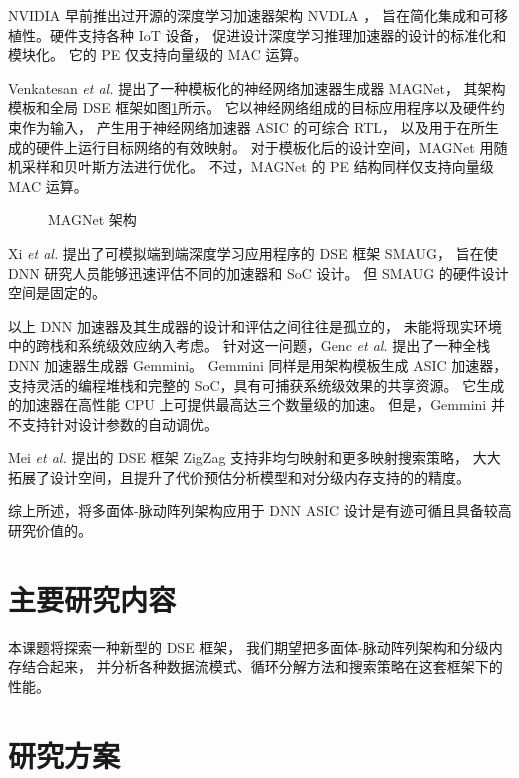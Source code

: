 NVIDIA 早前推出过开源的深度学习加速器架构 NVDLA \cite{nvidia_nvdla_2018}，
旨在简化集成和可移植性。硬件支持各种 IoT 设备，
促进设计深度学习推理加速器的设计的标准化和模块化。
它的 PE 仅支持向量级的 MAC 运算。

Venkatesan \textit{et al.}\cite{venkatesan_magnet_2019}
提出了一种模板化的神经网络加速器生成器 MAGNet，
其架构模板和全局 DSE 框架如图\ref{magnet}所示。
它以神经网络组成的目标应用程序以及硬件约束作为输入，
产生用于神经网络加速器 ASIC 的可综合 RTL，
以及用于在所生成的硬件上运行目标网络的有效映射。
对于模板化后的设计空间，MAGNet 用随机采样和贝叶斯方法进行优化。
不过，MAGNet 的 PE 结构同样仅支持向量级 MAC 运算。

\begin{figure}[htbp]
    \centering
    \caption{MAGNet 架构}
    \label{magnet}
\end{figure}

Xi \textit{et al.}\cite{xi_smaug_2020}
提出了可模拟端到端深度学习应用程序的 DSE 框架 SMAUG，
旨在使 DNN 研究人员能够迅速评估不同的加速器和 SoC 设计。
但 SMAUG 的硬件设计空间是固定的。

以上 DNN 加速器及其生成器的设计和评估之间往往是孤立的，
未能将现实环境中的跨栈和系统级效应纳入考虑。
针对这一问题，Genc \textit{et al.}\cite{genc_gemmini_2021}
提出了一种全栈 DNN 加速器生成器 Gemmini。
Gemmini 同样是用架构模板生成 ASIC 加速器，
支持灵活的编程堆栈和完整的 SoC，具有可捕获系统级效果的共享资源。
它生成的加速器在高性能 CPU 上可提供最高达三个数量级的加速。
但是，Gemmini 并不支持针对设计参数的自动调优。

Mei \textit{et al.}\cite{mei_zigzag_2021}
提出的 DSE 框架 ZigZag 支持非均匀映射和更多映射搜索策略，
大大拓展了设计空间，且提升了代价预估分析模型和对分级内存支持的的精度。

综上所述，将多面体-脉动阵列架构应用于 DNN ASIC 设计是有迹可循且具备较高研究价值的。

\section{主要研究内容}

本课题将探索一种新型的 DSE 框架，
我们期望把多面体-脉动阵列架构和分级内存结合起来，
并分析各种数据流模式、循环分解方法和搜索策略在这套框架下的性能。

\section{研究方案}



